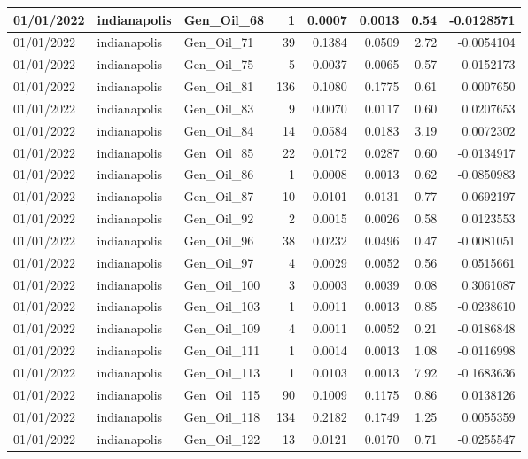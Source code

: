 \documentclass[
  letterpaper,
  DIV=11,
  numbers=noendperiod]{scrartcl}
\begin{document}
\begin{tabular}{l|l|l|r|r|r|r|r}
\hline
01/01/2022 & indianapolis & Gen\_Oil\_68 & 1 & 0.0007 & 0.0013 & 0.54 & -0.0128571\\
\hline
01/01/2022 & indianapolis & Gen\_Oil\_71 & 39 & 0.1384 & 0.0509 & 2.72 & -0.0054104\\
\hline
01/01/2022 & indianapolis & Gen\_Oil\_75 & 5 & 0.0037 & 0.0065 & 0.57 & -0.0152173\\
\hline
01/01/2022 & indianapolis & Gen\_Oil\_81 & 136 & 0.1080 & 0.1775 & 0.61 & 0.0007650\\
\hline
01/01/2022 & indianapolis & Gen\_Oil\_83 & 9 & 0.0070 & 0.0117 & 0.60 & 0.0207653\\
\hline
01/01/2022 & indianapolis & Gen\_Oil\_84 & 14 & 0.0584 & 0.0183 & 3.19 & 0.0072302\\
\hline
01/01/2022 & indianapolis & Gen\_Oil\_85 & 22 & 0.0172 & 0.0287 & 0.60 & -0.0134917\\
\hline
01/01/2022 & indianapolis & Gen\_Oil\_86 & 1 & 0.0008 & 0.0013 & 0.62 & -0.0850983\\
\hline
01/01/2022 & indianapolis & Gen\_Oil\_87 & 10 & 0.0101 & 0.0131 & 0.77 & -0.0692197\\
\hline
01/01/2022 & indianapolis & Gen\_Oil\_92 & 2 & 0.0015 & 0.0026 & 0.58 & 0.0123553\\
\hline
01/01/2022 & indianapolis & Gen\_Oil\_96 & 38 & 0.0232 & 0.0496 & 0.47 & -0.0081051\\
\hline
01/01/2022 & indianapolis & Gen\_Oil\_97 & 4 & 0.0029 & 0.0052 & 0.56 & 0.0515661\\
\hline
01/01/2022 & indianapolis & Gen\_Oil\_100 & 3 & 0.0003 & 0.0039 & 0.08 & 0.3061087\\
\hline
01/01/2022 & indianapolis & Gen\_Oil\_103 & 1 & 0.0011 & 0.0013 & 0.85 & -0.0238610\\
\hline
01/01/2022 & indianapolis & Gen\_Oil\_109 & 4 & 0.0011 & 0.0052 & 0.21 & -0.0186848\\
\hline
01/01/2022 & indianapolis & Gen\_Oil\_111 & 1 & 0.0014 & 0.0013 & 1.08 & -0.0116998\\
\hline
01/01/2022 & indianapolis & Gen\_Oil\_113 & 1 & 0.0103 & 0.0013 & 7.92 & -0.1683636\\
\hline
01/01/2022 & indianapolis & Gen\_Oil\_115 & 90 & 0.1009 & 0.1175 & 0.86 & 0.0138126\\
\hline
01/01/2022 & indianapolis & Gen\_Oil\_118 & 134 & 0.2182 & 0.1749 & 1.25 & 0.0055359\\
\hline
01/01/2022 & indianapolis & Gen\_Oil\_122 & 13 & 0.0121 & 0.0170 & 0.71 & -0.0255547\\

\end{tabular}
\end{document}
